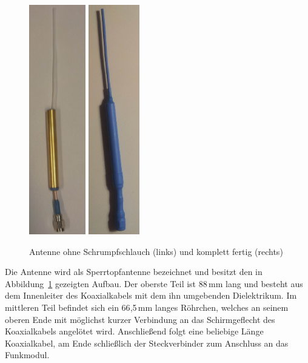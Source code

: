 \documentclass[pdftex, parskip, numbers=noenddot, toc=listof]{scrbook}
\begin{document}
	\begin{figure}
		\centering
		\includegraphics[height=10cm]{Bilder/Antenne}%
		\includegraphics[height=10cm]{Bilder/AntenneKomplett}
		\caption{Antenne ohne Schrumpfschlauch (links) und komplett fertig (rechts)}
		\label{fig:antenne}
	\end{figure}

	Die Antenne wird als Sperrtopfantenne bezeichnet und besitzt den in Abbildung~\ref{fig:antenne} gezeigten Aufbau. Der oberste Teil ist 88\,mm lang und besteht aus dem Innenleiter des Koaxialkabels mit dem ihn umgebenden Dielektrikum. Im mittleren Teil befindet sich ein 66{,}5\,mm langes Röhrchen, welches an seinem oberen Ende mit möglichst kurzer Verbindung an das Schirmgeflecht des Koaxialkabels angelötet wird. Anschließend folgt eine beliebige Länge Koaxialkabel, am Ende schließlich der Steckverbinder zum Anschluss an das Funkmodul.
\end{document}
